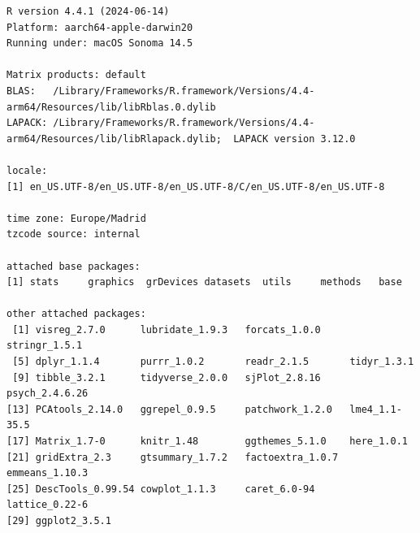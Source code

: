 \documentclass[
  letterpaper,
  DIV=11,
  numbers=noendperiod]{scrreprt}
\begin{document}
\begin{verbatim}
R version 4.4.1 (2024-06-14)
Platform: aarch64-apple-darwin20
Running under: macOS Sonoma 14.5

Matrix products: default
BLAS:   /Library/Frameworks/R.framework/Versions/4.4-arm64/Resources/lib/libRblas.0.dylib 
LAPACK: /Library/Frameworks/R.framework/Versions/4.4-arm64/Resources/lib/libRlapack.dylib;  LAPACK version 3.12.0

locale:
[1] en_US.UTF-8/en_US.UTF-8/en_US.UTF-8/C/en_US.UTF-8/en_US.UTF-8

time zone: Europe/Madrid
tzcode source: internal

attached base packages:
[1] stats     graphics  grDevices datasets  utils     methods   base     

other attached packages:
 [1] visreg_2.7.0      lubridate_1.9.3   forcats_1.0.0     stringr_1.5.1    
 [5] dplyr_1.1.4       purrr_1.0.2       readr_2.1.5       tidyr_1.3.1      
 [9] tibble_3.2.1      tidyverse_2.0.0   sjPlot_2.8.16     psych_2.4.6.26   
[13] PCAtools_2.14.0   ggrepel_0.9.5     patchwork_1.2.0   lme4_1.1-35.5    
[17] Matrix_1.7-0      knitr_1.48        ggthemes_5.1.0    here_1.0.1       
[21] gridExtra_2.3     gtsummary_1.7.2   factoextra_1.0.7  emmeans_1.10.3   
[25] DescTools_0.99.54 cowplot_1.1.3     caret_6.0-94      lattice_0.22-6   
[29] ggplot2_3.5.1    


\end{verbatim}
\end{document}
